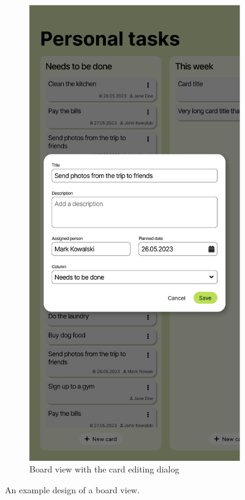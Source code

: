 \begin{figure}
    \begin{subfigure}[m]{0.35\textwidth}
        \centering
        \includegraphics[height=0.4\textheight]{./3-research-methodology/board-view-with-dialog}
        \caption{Board view with the card editing dialog}
        \label{fig:3-4-board-view-with-dialog}
    \end{subfigure}
    \caption{An example design of a board view.}
    \label{fig:3-4-board-view}
\end{figure}

